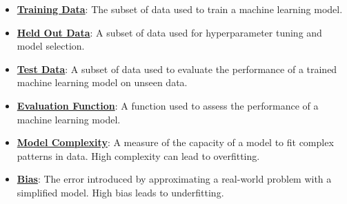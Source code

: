 \documentclass{article}%
\begin{document}
\begin{itemize}[leftmargin=*]%
\item \href{https://purdue.brightspace.com/d2l/common/assets/pdfjs-d2l-dist/1.0.14-legacy/web/viewer.html?file=%2Fcontent%2Fenforced%2F1095467-wl.202510.CS.24300.001%2F10L1-CrossValidation.pdf%3Fou%3D1095467&lang=en-us&container=d2l-fileviewer-rendered-pdf&fullscreen=d2l-fileviewer-rendered-pdf-dialog&height=667#page=6}{\textbf{Training Data}}: The subset of data used to train a machine learning model.%
\item \href{https://purdue.brightspace.com/d2l/common/assets/pdfjs-d2l-dist/1.0.14-legacy/web/viewer.html?file=%2Fcontent%2Fenforced%2F1095467-wl.202510.CS.24300.001%2F10L1-CrossValidation.pdf%3Fou%3D1095467&lang=en-us&container=d2l-fileviewer-rendered-pdf&fullscreen=d2l-fileviewer-rendered-pdf-dialog&height=667#page=6}{\textbf{Held Out Data}}: A subset of data used for hyperparameter tuning and model selection.%
\item \href{https://purdue.brightspace.com/d2l/common/assets/pdfjs-d2l-dist/1.0.14-legacy/web/viewer.html?file=%2Fcontent%2Fenforced%2F1095467-wl.202510.CS.24300.001%2F10L1-CrossValidation.pdf%3Fou%3D1095467&lang=en-us&container=d2l-fileviewer-rendered-pdf&fullscreen=d2l-fileviewer-rendered-pdf-dialog&height=667#page=6}{\textbf{Test Data}}: A subset of data used to evaluate the performance of a trained machine learning model on unseen data.%
\item \href{https://purdue.brightspace.com/d2l/common/assets/pdfjs-d2l-dist/1.0.14-legacy/web/viewer.html?file=%2Fcontent%2Fenforced%2F1095467-wl.202510.CS.24300.001%2F10L1-CrossValidation.pdf%3Fou%3D1095467&lang=en-us&container=d2l-fileviewer-rendered-pdf&fullscreen=d2l-fileviewer-rendered-pdf-dialog&height=667#page=9}{\textbf{Evaluation Function}}: A function used to assess the performance of a machine learning model.%
\item \href{https://purdue.brightspace.com/d2l/common/assets/pdfjs-d2l-dist/1.0.14-legacy/web/viewer.html?file=%2Fcontent%2Fenforced%2F1095467-wl.202510.CS.24300.001%2F10L1-CrossValidation.pdf%3Fou%3D1095467&lang=en-us&container=d2l-fileviewer-rendered-pdf&fullscreen=d2l-fileviewer-rendered-pdf-dialog&height=667#page=13}{\textbf{Model Complexity}}: A measure of the capacity of a model to fit complex patterns in data. High complexity can lead to overfitting.%
\item \href{https://purdue.brightspace.com/d2l/common/assets/pdfjs-d2l-dist/1.0.14-legacy/web/viewer.html?file=%2Fcontent%2Fenforced%2F1095467-wl.202510.CS.24300.001%2F10L1-CrossValidation.pdf%3Fou%3D1095467&lang=en-us&container=d2l-fileviewer-rendered-pdf&fullscreen=d2l-fileviewer-rendered-pdf-dialog&height=667#page=4}{\textbf{Bias}}: The error introduced by approximating a real-world problem with a simplified model. High bias leads to underfitting.%

\end{itemize}
\end{document}
